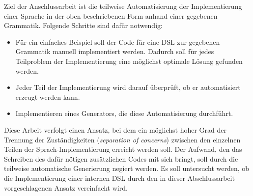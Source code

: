 Ziel der Anschlussarbeit ist die teilweise Automatisierung der Implementierung einer Sprache in der oben beschriebenen Form anhand einer gegebenen Grammatik. Folgende Schritte sind dafür notwendig:
\begin{itemize}
	\item Für ein einfaches Beispiel soll der Code für eine DSL zur gegebenen Grammatik manuell implementiert werden. Dadurch soll für jedes Teilproblem der Implementierung eine möglichst optimale Lösung gefunden werden.
	\item Jeder Teil der Implementierung wird darauf überprüft, ob er automatisiert erzeugt werden kann.
	\item Implementieren eines Generators, die diese Automatisierung durchführt.
\end{itemize}

Diese Arbeit verfolgt einen Ansatz, bei dem ein möglichst hoher Grad der Trennung der Zuständigkeiten (\emph{separation of concerns}) zwischen den einzelnen Teilen der Sprach-Implementierung erreicht werden soll. Der Aufwand, den das Schreiben des dafür nötigen zusätzlichen Codes mit sich bringt, soll durch die teilweise automatische Generierung negiert werden.
Es soll untersucht werden, ob die Implementierung einer internen DSL durch den in dieser Abschlussarbeit vorgeschlagenen Ansatz vereinfacht wird.